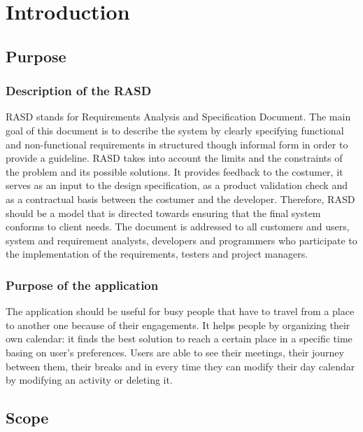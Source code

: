 \documentclass[12pt,titlepage]{article}
\begin{document}
\tableofcontents

\pagebreak

\section{Introduction} \label{introduzione}

\subsection{Purpose} \label{sec:purpose}

\medskip
\subsubsection{Description of the RASD}\label{RASD}
RASD stands for Requirements Analysis and Specification Document.
The main goal of this document is to describe the system by clearly specifying functional and non-functional requirements in structured though informal form in order to provide a guideline.
RASD takes into account the limits and the constraints of the problem and its possible solutions. 
It provides feedback to the costumer, it serves as an input to the design specification, as a product validation check and as a contractual basis between the costumer and the developer.
Therefore, RASD should be a model that is directed towards ensuring that the final system conforms to client needs.
The document is addressed to all customers and users, system and requirement analysts, developers and programmers who participate to the implementation of the requirements, testers and project managers.

\subsubsection{Purpose of the application}\label{RASD}
The application should be useful for busy people that have to travel from a place to another one because of their engagements. It helps people by organizing their own calendar: it finds the best solution to reach a certain place in a specific time basing on user's preferences. 
Users are able to see their meetings, their journey between them, their breaks and in every time they can modify their day calendar by modifying an activity or deleting it.

\subsection{Scope}\label{RASD}
\end{document}
